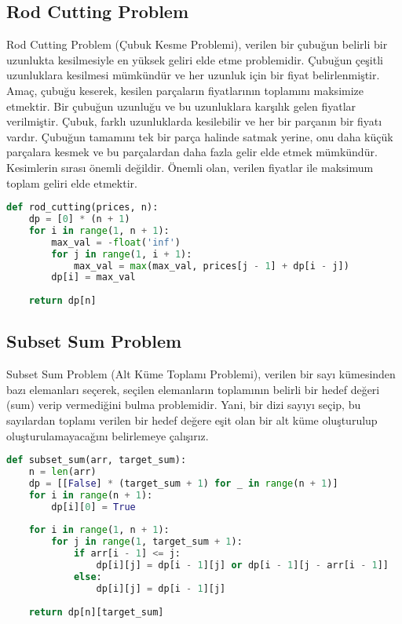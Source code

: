 \newpage

\subsection{Rod Cutting Problem}

Rod Cutting Problem (Çubuk Kesme Problemi), verilen bir çubuğun belirli bir uzunlukta kesilmesiyle en yüksek geliri elde etme problemidir. Çubuğun çeşitli uzunluklara kesilmesi mümkündür ve her uzunluk için bir fiyat belirlenmiştir. Amaç, çubuğu keserek, kesilen parçaların fiyatlarının toplamını maksimize etmektir. Bir çubuğun uzunluğu ve bu uzunluklara karşılık gelen fiyatlar verilmiştir. Çubuk, farklı uzunluklarda kesilebilir ve her bir parçanın bir fiyatı vardır. Çubuğun tamamını tek bir parça halinde satmak yerine, onu daha küçük parçalara kesmek ve bu parçalardan daha fazla gelir elde etmek mümkündür. Kesimlerin sırası önemli değildir. Önemli olan, verilen fiyatlar ile maksimum toplam geliri elde etmektir.

\begin{lstlisting}[language=Python]
def rod_cutting(prices, n):
    dp = [0] * (n + 1)
    for i in range(1, n + 1):
        max_val = -float('inf')
        for j in range(1, i + 1):
            max_val = max(max_val, prices[j - 1] + dp[i - j])
        dp[i] = max_val
    
    return dp[n]
\end{lstlisting}

\newpage

\subsection{Subset Sum Problem}

Subset Sum Problem (Alt Küme Toplamı Problemi), verilen bir sayı kümesinden bazı elemanları seçerek, seçilen elemanların toplamının belirli bir hedef değeri (sum) verip vermediğini bulma problemidir. Yani, bir dizi sayıyı seçip, bu sayılardan toplamı verilen bir hedef değere eşit olan bir alt küme oluşturulup oluşturulamayacağını belirlemeye çalışırız.

\begin{lstlisting}[language=Python]
def subset_sum(arr, target_sum):
    n = len(arr)
    dp = [[False] * (target_sum + 1) for _ in range(n + 1)]
    for i in range(n + 1):
        dp[i][0] = True
    
    for i in range(1, n + 1):
        for j in range(1, target_sum + 1):
            if arr[i - 1] <= j:
                dp[i][j] = dp[i - 1][j] or dp[i - 1][j - arr[i - 1]]
            else:
                dp[i][j] = dp[i - 1][j]
    
    return dp[n][target_sum]
\end{lstlisting}

\newpage